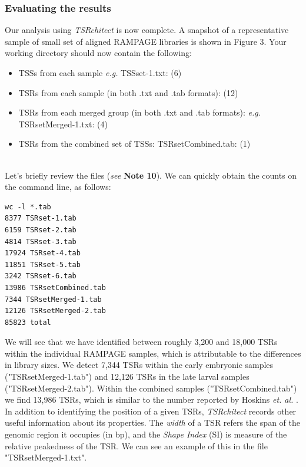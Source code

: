 \documentclass[runningheads,a4paper]{llncs}
\begin{document}
\begin{linenumbers}
\subsubsection{Evaluating the results}
Our analysis using \textit{TSRchitect} is now complete.
A snapshot of a representative sample of small set of aligned RAMPAGE libraries is shown in Figure 3.
Your working directory should now contain the following: 
\begin{itemize}
\item TSSs from each sample \textit{e.g.} TSSset-1.txt: (6)
\item TSRs from each sample (in both .txt and .tab formats): (12)
\item TSRs from each merged group (in both .txt and .tab formats): \textit{e.g.} TSRsetMerged-1.txt: (4)
\item TSRs from the combined set of TSSs: TSRsetCombined.tab: (1)
\end{itemize} \\

\noindent
Let's briefly review the files (\textit{see} \textbf{Note 10}). 
We can quickly obtain the counts on the command line, as follows:

\noindent
\begin{verbatim}
wc -l *.tab
8377 TSRset-1.tab
6159 TSRset-2.tab
4814 TSRset-3.tab
17924 TSRset-4.tab
11851 TSRset-5.tab
3242 TSRset-6.tab
13986 TSRsetCombined.tab
7344 TSRsetMerged-1.tab
12126 TSRsetMerged-2.tab
85823 total
\end{verbatim}

\noindent
We will see that we have identified between roughly 3,200 and 18,000 TSRs within the individual RAMPAGE samples, which is attributable to the differences in library sizes. 
We detect 7,344 TSRs within the early embryonic samples ("TSRsetMerged-1.tab") and 12,126 TSRs in the late larval samples ("TSRsetMerged-2.tab").
Within the combined samples ("TSRsetCombined.tab") we find 13,986 TSRs, which is similar to the number reported by Hoskins \textit{et. al.} \cite{Hoskins:2011io}.\\

\noindent
In addition to identifying the position of a given TSRs, \textit{TSRchitect} records other useful information about its properties.
The \textit{width} of a TSR refers the span of the genomic region it occupies (in bp), and the \textit{Shape Index} (SI) is measure of the relative peakedness of the TSR.
We can see an example of this in the file "TSRsetMerged-1.txt".


\end{linenumbers}
\end{document}
